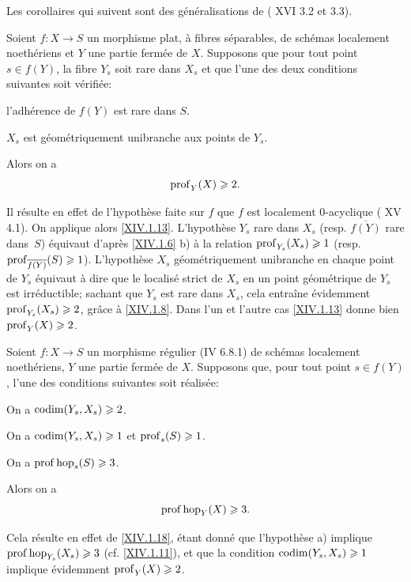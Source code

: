 Les corollaires qui suivent sont des g\'en\'eralisations de ( XVI 3.2 et 3.3).

\begin{corollaire} \label{XIV.1.19}
Soient $f:X\to S$ un morphisme plat, \`a fibres s\'eparables, de sch\'emas localement noeth\'eriens et $Y$ une partie ferm\'ee de $X$. Supposons que pour tout point $s\in f(Y)$, la fibre $Y_s$ soit rare dans $X_s$ et que l'une des deux conditions suivantes soit v\'erifi\'ee:
\begin{enumeratea}
\item
l'adh\'erence de $f(Y)$ est rare dans $S$.
\item
$X_s$ est g\'eom\'etriquement unibranche aux points de $Y_s$.
\par\noindent
Alors on a
$$
\operatorname{prof}_Y(X)\geqslant 2.
$$
\end{enumeratea}
\end{corollaire}

Il r\'esulte en effet de l'hypoth\`ese faite sur $f$ que $f$ est localement $0$-acyclique ( XV 4.1). On applique alors \ref{XIV.1.13}. L'hypoth\`ese $Y_s$ rare dans $X_s$ (resp. $\overline{f(Y)}$ rare dans~$S$) \'equivaut d'apr\`es \ref{XIV.1.6} b) \`a la relation $\operatorname{prof}_{Y_s}(X_s)\geqslant 1$ (resp. $\operatorname{prof}_{\overline{f(Y)}}(S)\geqslant 1$). L'hypoth\`ese $X_s$ g\'eom\'etriquement unibranche en chaque point de $Y_s$ \'equivaut \`a dire que le localis\'e strict de $X_s$ en un point g\'eom\'etrique de $Y_s$ est irr\'eductible; sachant que $Y_s$ est rare dans $X_s$, cela entra\^ine \'evidemment $\operatorname{prof}_{Y_s}(X_s)\geqslant 2$, gr\^ace \`a \ref{XIV.1.8}. Dans l'un et l'autre cas \ref{XIV.1.13} donne bien $\operatorname{prof}_Y(X)\geqslant 2$.

\begin{corollaire} \label{XIV.1.20}
Soient $f:X\to S$ un morphisme r\'egulier (\textup{\EGA IV 6.8.1}) de sch\'emas localement noeth\'eriens, $Y$ une partie ferm\'ee de $X$. Supposons que, pour tout point $s\in f(Y)$, l'une des conditions suivantes soit r\'ealis\'ee:
\begin{enumeratea}
\item
On a $\operatorname{codim}(Y_s, X_s)\geqslant 2$.
\item
On a $\operatorname{codim}(Y_s, X_s)\geqslant 1$ et $\operatorname{prof}_s(S)\geqslant 1$.
\item
On a $\operatorname{prof}\operatorname{hop}_s(S)\geqslant 3$.
\end{enumeratea}
\noindent
Alors on a
$$
\operatorname{prof}\operatorname{hop}_Y(X)\geqslant 3.
$$
\end{corollaire}

Cela r\'esulte en effet de \ref{XIV.1.18}, \'etant donn\'e que l'hypoth\`ese a) implique $\operatorname{prof}\operatorname{hop}_{Y_s}(X_s)\geqslant 3$ (cf. \ref{XIV.1.11}), et que la condition $\operatorname{codim}(Y_s, X_s)\geqslant 1$ implique \'evidemment $\operatorname{prof}_Y(X)\geqslant 2$.

